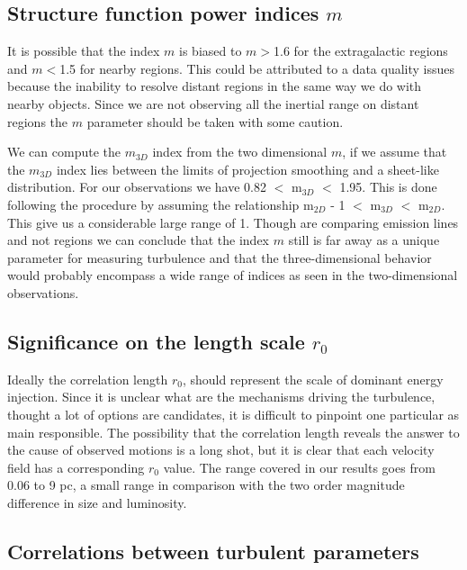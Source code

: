 \documentclass[fleqn,usenatbib, useAMS, a4paper]{mnras}
\begin{document}
\subsection{Structure function power indices \(m\)}

It is possible that the index \(m\) is biased to \(m>\)1.6 for the extragalactic regions and \(m<\)1.5 for nearby regions.
This could be attributed to a data quality issues because the inability to resolve distant regions in the same way we do with nearby objects.
Since we are not observing all the inertial range on distant regions the \(m\) parameter  should be taken with some caution.

We can compute the $m_{3D}$ index from the two dimensional \(m\), if we assume that the $m_{3D}$ index lies between the limits of projection smoothing and a sheet-like distribution. 
For our observations we have 0.82 $<$ m$_{3D}$ $<$ 1.95.
This is done following the procedure by \cite{arthur2016turbulence} assuming the relationship m$_{2D}$ - 1 $<$ m$_{3D}$ $<$ m$_{2D}$.
This give us a considerable large range of 1. 
Though \cite{arthur2016turbulence} are comparing emission lines and not regions we can conclude that the index \(m\) still is far away as a unique parameter for measuring turbulence and that the three-dimensional behavior would probably encompass a wide range of indices as seen in the two-dimensional observations.


\subsection{Significance on the length scale \(r_0\)}

Ideally the correlation length \(r_0\), should represent the scale of dominant energy injection. 
Since it is unclear what are the mechanisms driving the turbulence, thought a lot of options are candidates, it is difficult to pinpoint one particular as main responsible. 
The possibility that the correlation length reveals the answer to the cause of observed motions is a long shot, but it is clear that each velocity field has a corresponding \(r_0\) value. 
The range covered in our results goes from 0.06 to 9 pc, a small range in comparison with the two order magnitude difference in size and luminosity.

\subsection{Correlations between turbulent parameters}
\end{document}
